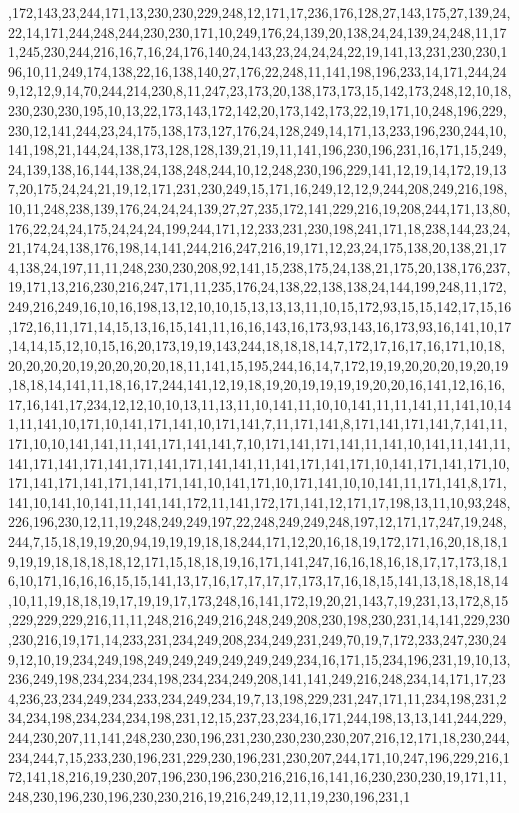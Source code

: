 ,172,143,23,244,171,13,230,230,229,248,12,171,17,236,176,128,27,143,175,27,139,24,22,14,171,244,248,244,230,230,171,10,249,176,24,139,20,138,24,24,139,24,248,11,171,245,230,244,216,16,7,16,24,176,140,24,143,23,24,24,24,22,19,141,13,231,230,230,196,10,11,249,174,138,22,16,138,140,27,176,22,248,11,141,198,196,233,14,171,244,249,12,12,9,14,70,244,214,230,8,11,247,23,173,20,138,173,173,15,142,173,248,12,10,18,230,230,230,195,10,13,22,173,143,172,142,20,173,142,173,22,19,171,10,248,196,229,230,12,141,244,23,24,175,138,173,127,176,24,128,249,14,171,13,233,196,230,244,10,141,198,21,144,24,138,173,128,128,139,21,19,11,141,196,230,196,231,16,171,15,249,24,139,138,16,144,138,24,138,248,244,10,12,248,230,196,229,141,12,19,14,172,19,137,20,175,24,24,21,19,12,171,231,230,249,15,171,16,249,12,12,9,244,208,249,216,198,10,11,248,238,139,176,24,24,24,139,27,27,235,172,141,229,216,19,208,244,171,13,80,176,22,24,24,175,24,24,24,199,244,171,12,233,231,230,198,241,171,18,238,144,23,24,21,174,24,138,176,198,14,141,244,216,247,216,19,171,12,23,24,175,138,20,138,21,174,138,24,197,11,11,248,230,230,208,92,141,15,238,175,24,138,21,175,20,138,176,237,19,171,13,216,230,216,247,171,11,235,176,24,138,22,138,138,24,144,199,248,11,172,249,216,249,16,10,16,198,13,12,10,10,15,13,13,13,11,10,15,172,93,15,15,142,17,15,16,172,16,11,171,14,15,13,16,15,141,11,16,16,143,16,173,93,143,16,173,93,16,141,10,17,14,14,15,12,10,15,16,20,173,19,19,143,244,18,18,18,14,7,172,17,16,17,16,171,10,18,20,20,20,20,19,20,20,20,20,18,11,141,15,195,244,16,14,7,172,19,19,20,20,20,19,20,19,18,18,14,141,11,18,16,17,244,141,12,19,18,19,20,19,19,19,19,20,20,16,141,12,16,16,17,16,141,17,234,12,12,10,10,13,11,13,11,10,141,11,10,10,141,11,11,141,11,141,10,141,11,141,10,171,10,141,171,141,10,171,141,7,11,171,141,8,171,141,171,141,7,141,11,171,10,10,141,141,11,141,171,141,141,7,10,171,141,171,141,11,141,10,141,11,141,11,141,171,141,171,141,171,141,171,141,141,11,141,171,141,171,10,141,171,141,171,10,171,141,171,141,171,141,171,141,10,141,171,10,171,141,10,10,141,11,171,141,8,171,141,10,141,10,141,11,141,141,172,11,141,172,171,141,12,171,17,198,13,11,10,93,248,226,196,230,12,11,19,248,249,249,197,22,248,249,249,248,197,12,171,17,247,19,248,244,7,15,18,19,19,20,94,19,19,19,18,18,244,171,12,20,16,18,19,172,171,16,20,18,18,19,19,19,18,18,18,18,12,171,15,18,18,19,16,171,141,247,16,16,18,16,18,17,17,173,18,16,10,171,16,16,16,15,15,141,13,17,16,17,17,17,17,173,17,16,18,15,141,13,18,18,18,14,10,11,19,18,18,19,17,19,19,17,173,248,16,141,172,19,20,21,143,7,19,231,13,172,8,15,229,229,229,216,11,11,248,216,249,216,248,249,208,230,198,230,231,14,141,229,230,230,216,19,171,14,233,231,234,249,208,234,249,231,249,70,19,7,172,233,247,230,249,12,10,19,234,249,198,249,249,249,249,249,249,234,16,171,15,234,196,231,19,10,13,236,249,198,234,234,234,198,234,234,249,208,141,141,249,216,248,234,14,171,17,234,236,23,234,249,234,233,234,249,234,19,7,13,198,229,231,247,171,11,234,198,231,234,234,198,234,234,234,198,231,12,15,237,23,234,16,171,244,198,13,13,141,244,229,244,230,207,11,141,248,230,230,196,231,230,230,230,230,207,216,12,171,18,230,244,234,244,7,15,233,230,196,231,229,230,196,231,230,207,244,171,10,247,196,229,216,172,141,18,216,19,230,207,196,230,196,230,216,216,16,141,16,230,230,230,19,171,11,248,230,196,230,196,230,230,216,19,216,249,12,11,19,230,196,231,1